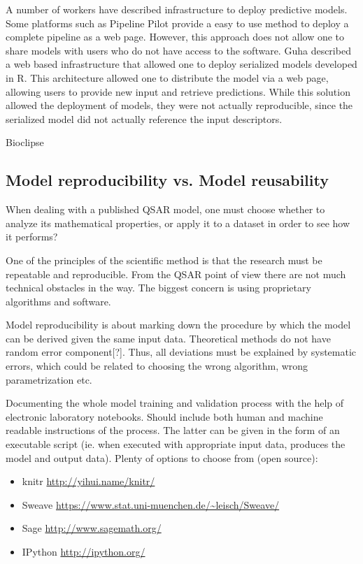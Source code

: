 \documentclass[12pt,letterpaper]{article}
\begin{document}
A number of workers have described infrastructure to deploy predictive
models. Some platforms such as Pipeline Pilot provide a easy to use
method to deploy a complete pipeline as a web page. However, this
approach does not allow one to share models with users who do not have
access to the software. Guha \cite{Guha:2007af} described a web based
infrastructure that allowed one to deploy serialized models developed
in R. This architecture allowed one to distribute the model via a web
page, allowing users to provide new input and retrieve
predictions. While this solution allowed the deployment of models,
they were not actually reproducible, since the serialized model did
not actually reference the input descriptors.

Bioclipse

\subsection{Model reproducibility vs. Model reusability}

When dealing with a published QSAR model, one must choose whether to
analyze its mathematical properties, or apply it to a dataset in order
to see how it performs?

One of the principles of the scientific method is that the research
must be repeatable and reproducible. From the QSAR point of view there
are not much technical obstacles in the way. The biggest concern is
using proprietary algorithms and software.

Model reproducibility is about marking down the procedure by which
the model can be derived given the same input data. Theoretical methods
do not have random error component[?]. Thus, all deviations must be
explained by systematic errors, which could be related to choosing the
wrong algorithm, wrong parametrization etc.

Documenting the whole model training and validation process with the
help of electronic laboratory notebooks. Should include both human and
machine readable instructions of the process. The latter can be given 
in the form of an executable script (ie. when executed with appropriate
input data, produces the model and output data). Plenty of options to
choose from (open source):
\begin{itemize}
  \item knitr \url{http://yihui.name/knitr/}
  \item Sweave \url{https://www.stat.uni-muenchen.de/~leisch/Sweave/}
  \item Sage \url{http://www.sagemath.org/}
  \item IPython \url{http://ipython.org/}
\end{itemize}
\end{document}
